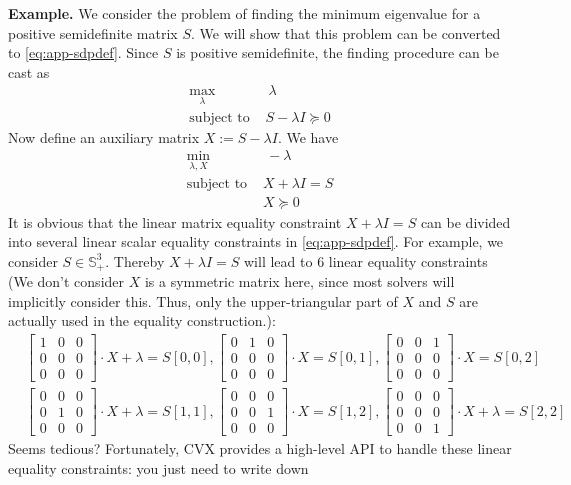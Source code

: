 \documentclass[
]{book}
\theoremstyle{definition}
\theoremstyle{definition}
\theoremstyle{definition}
\theoremstyle{definition}
\theoremstyle{remark}
\begin{document}
\textbf{Example.} We consider the problem of finding the minimum eigenvalue for a positive semidefinite matrix \(S\). We will show that this problem can be converted to \eqref{eq:app-sdpdef}. Since \(S\) is positive semidefinite, the finding procedure can be cast as
\begin{align}
    \max_\lambda & \ \lambda \\
    \text{subject to } & S - \lambda I \succeq 0
\end{align}
Now define an auxiliary matrix \(X := S - \lambda I\). We have
\begin{align}
    \min_{\lambda, X} & \ -\lambda \\
   \text{subject to } &  X + \lambda I = S \\
   & X \succeq 0
\end{align}
It is obvious that the linear matrix equality constraint \(X + \lambda I = S\) can be divided into several linear scalar equality constraints in \eqref{eq:app-sdpdef}. For example, we consider \(S \in \mathbb{S}_+^3\). Thereby \(X + \lambda I = S\) will lead to \(6\) linear equality constraints (We don't consider \(X\) is a symmetric matrix here, since most solvers will implicitly consider this. Thus, only the upper-triangular part of \(X\) and \(S\) are actually used in the equality construction.):
\begin{align}
   &  \begin{bmatrix}
      1 & 0 & 0 \\ 0 & 0 & 0 \\ 0 & 0 & 0
   \end{bmatrix} \cdot X  + \lambda = S[0, 0],  
    \begin{bmatrix}
      0 & 1 & 0 \\ 0 & 0 & 0 \\ 0 & 0 & 0
   \end{bmatrix} \cdot X  = S[0, 1],
    \begin{bmatrix}
      0 & 0 & 1 \\ 0 & 0 & 0 \\ 0 & 0 & 0
   \end{bmatrix} \cdot X  = S[0, 2] \\
   &  \begin{bmatrix}
      0 & 0 & 0 \\ 0 & 1 & 0 \\ 0 & 0 & 0
   \end{bmatrix} \cdot X  + \lambda = S[1, 1],
    \begin{bmatrix}
      0 & 0 & 0 \\ 0 & 0 & 1 \\ 0 & 0 & 0
   \end{bmatrix} \cdot X  = S[1, 2], 
    \begin{bmatrix}
      0 & 0 & 0 \\ 0 & 0 & 0 \\ 0 & 0 & 1
   \end{bmatrix} \cdot X  + \lambda = S[2, 2] 
\end{align}
Seems tedious? Fortunately, CVX provides a high-level API to handle these linear equality constraints: you just need to write down
\end{document}
